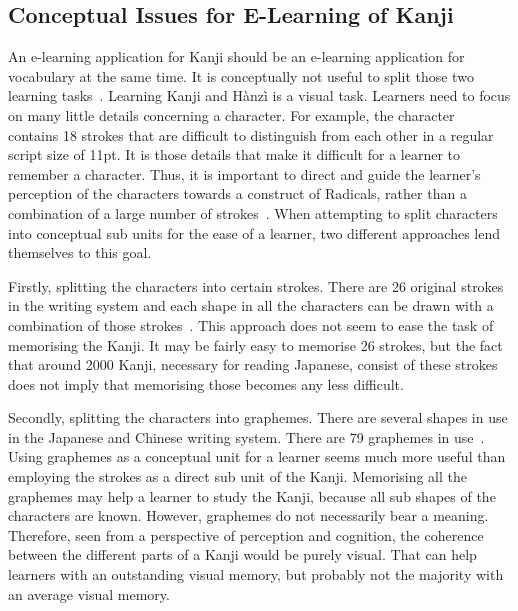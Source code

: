 \subsection{Conceptual Issues for E-Learning of Kanji}
\label{sec:elearn:conceptualissuesforelearningofkanji}

An e-learning application for Kanji should be an e-learning application for
vocabulary at the same time. It is conceptually not useful to split those two 
learning tasks~.
Learning Kanji and Hànzì is a visual task. Learners need to focus on many little
details concerning a character. For example, the character~ contains 18 
strokes that are difficult to distinguish from each other in a regular script 
size of 11pt. It is those details that make it difficult for a learner to 
remember a character. Thus, it is important to direct and guide the learner's 
perception of the characters towards a construct of Radicals, rather than a 
combination of a large number of strokes~.
When attempting to split characters into conceptual sub units for the ease of
a learner, two different approaches lend themselves to this goal.

Firstly, splitting the characters into certain strokes. There are 26 original 
strokes in the writing system and each shape in all the characters can be drawn
with a combination of those strokes~.
This approach does not seem to ease the task of memorising the Kanji.
It may be fairly easy to memorise 26 strokes, but the fact that around 
2000 Kanji, necessary for reading Japanese, consist of these strokes does not
imply that memorising those becomes any less difficult.

Secondly, splitting the characters into graphemes. There are several shapes
in use in the Japanese and Chinese writing system. There are 79 graphemes in 
use~.
Using graphemes as a conceptual unit for a learner seems much more useful than
employing the strokes as a direct sub unit of the Kanji.
Memorising all the graphemes may help a learner to study the Kanji, because all 
sub shapes of the characters are known. However, graphemes do not necessarily 
bear a meaning. Therefore, seen from a perspective of perception and cognition, 
the coherence between the different parts of a Kanji would be purely visual.
That can help learners with an outstanding visual memory, but probably not
the majority with an average visual memory.

